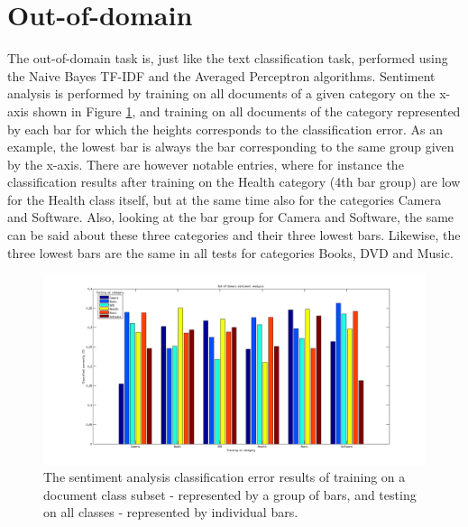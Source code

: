 \section{Out-of-domain}
The out-of-domain task is, just like the text classification task, performed using the Naive Bayes TF-IDF and the Averaged Perceptron algorithms. Sentiment analysis is performed by training on all documents of a given category on the x-axis shown in Figure \ref{fig:outofdomain}, and training on all documents of the category represented by each bar for which the heights corresponds to the classification error. As an example, the lowest bar is always the bar corresponding to the same group given by the x-axis. There are however notable entries, where for instance the classification results after training on the Health category (4th bar group) are low for the Health class itself, but at the same time also for the categories Camera and Software. Also, looking at the bar group for Camera and Software, the same can be said about these three categories and their three lowest bars. Likewise, the three lowest bars are the same in all tests for categories Books, DVD and Music.

\begin{figure}[h!]
\centering
\includegraphics[width=1\linewidth]{../Plottar/outofdomain.png}
\caption{The sentiment analysis classification error results of training on a document class subset - represented by a group of bars, and testing on all classes - represented by individual bars.}
\label{fig:outofdomain}
\end{figure}  

